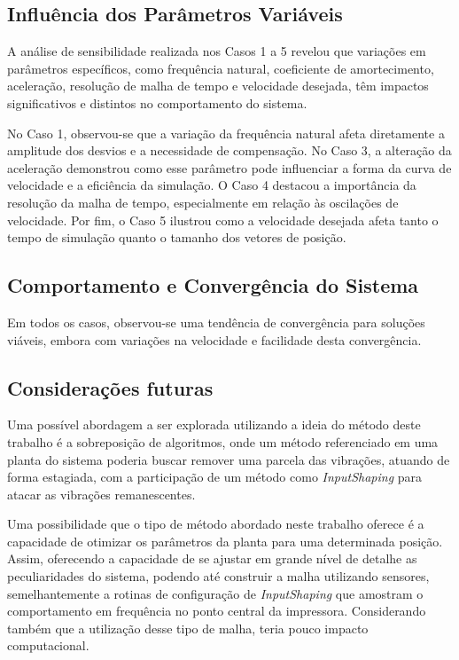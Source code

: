 \subsection{Influência dos Parâmetros Variáveis}
A análise de sensibilidade realizada nos Casos 1 a 5 revelou que variações em parâmetros específicos, como frequência natural, coeficiente de amortecimento, aceleração, resolução de malha de tempo e velocidade desejada, têm impactos significativos e distintos no comportamento do sistema. 

No Caso 1, observou-se que a variação da frequência natural afeta diretamente a amplitude dos desvios e a necessidade de compensação. No Caso 3, a alteração da aceleração demonstrou como esse parâmetro pode influenciar a forma da curva de velocidade e a eficiência da simulação. O Caso 4 destacou a importância da resolução da malha de tempo, especialmente em relação às oscilações de velocidade. Por fim, o Caso 5 ilustrou como a velocidade desejada afeta tanto o tempo de simulação quanto o tamanho dos vetores de posição.

\subsection{Comportamento e Convergência do Sistema}
Em todos os casos, observou-se uma tendência de convergência para soluções viáveis, embora com variações na velocidade e facilidade desta convergência. 


\subsection{Considerações futuras}
Uma possível abordagem a ser explorada utilizando a ideia do método deste trabalho é a sobreposição de algoritmos, onde
um método referenciado em uma planta do sistema poderia buscar remover uma parcela das vibrações, atuando de forma estagiada,
com a participação de um método como \textit{InputShaping} para atacar as vibrações remanescentes.

Uma possibilidade que o tipo de método abordado neste trabalho oferece é a capacidade de otimizar os parâmetros da planta para uma determinada posição.
Assim, oferecendo a capacidade de se ajustar em grande nível de detalhe as peculiaridades do sistema, podendo até
construir a malha utilizando sensores, semelhantemente a rotinas de configuração de \textit{InputShaping} que amostram
o comportamento em frequência no ponto central da impressora. Considerando também que a utilização desse tipo de malha,
teria pouco impacto computacional.


